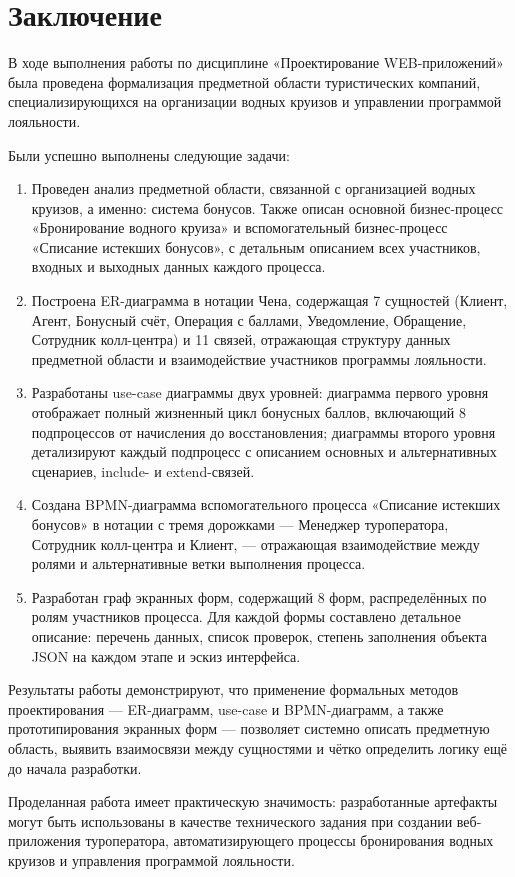 \documentclass[11pt,a4paper,final]{article}
\begin{document}
\newpage
\section*{Заключение}

В ходе выполнения работы по дисциплине «Проектирование WEB-приложений»
была проведена формализация предметной области туристических компаний,
специализирующихся на организации водных круизов и управлении программой лояльности.

Были успешно выполнены следующие задачи:

\begin{enumerate}
	\item Проведен анализ предметной области, связанной с организацией водных круизов, а именно: система бонусов. Также описан
	основной бизнес-процесс «Бронирование водного круиза» и вспомогательный
	бизнес-процесс «Списание истекших бонусов», с детальным описанием всех
	участников, входных и выходных данных каждого процесса.
	
	\item Построена ER-диаграмма в нотации Чена, содержащая 7 сущностей
	(Клиент, Агент, Бонусный счёт, Операция с баллами, Уведомление, Обращение,
	Сотрудник колл-центра) и 11 связей, отражающая структуру данных предметной
	области и взаимодействие участников программы лояльности.
	
	\item Разработаны use-case диаграммы двух уровней: диаграмма первого уровня
	отображает полный жизненный цикл бонусных баллов, включающий 8 подпроцессов
	от начисления до восстановления; диаграммы второго уровня детализируют каждый
	подпроцесс с описанием основных и альтернативных сценариев, include- и
	extend-связей.
	
	\item Создана BPMN-диаграмма вспомогательного процесса «Списание истекших
	бонусов» в нотации с тремя дорожками — Менеджер туроператора, Сотрудник
	колл-центра и Клиент, — отражающая взаимодействие между ролями и альтернативные ветки выполнения процесса.
	
	\item Разработан граф экранных форм, содержащий 8 форм, распределённых по
	ролям участников процесса. Для каждой формы составлено детальное описание:
	перечень данных, список проверок, степень заполнения объекта JSON на каждом
	этапе и эскиз интерфейса.
\end{enumerate}

Результаты работы демонстрируют, что применение формальных методов
проектирования — ER-диаграмм, use-case и BPMN-диаграмм, а также прототипирования
экранных форм — позволяет системно описать предметную область, выявить
взаимосвязи между сущностями и чётко определить логику ещё до начала разработки.

Проделанная работа имеет практическую значимость: разработанные артефакты могут
быть использованы в качестве технического задания при создании
веб-приложения туроператора, автоматизирующего процессы бронирования водных
круизов и управления программой лояльности.

	
\end{document}
